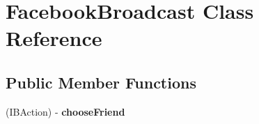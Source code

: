 \hypertarget{interface_facebook_broadcast}{
\section{\-Facebook\-Broadcast \-Class \-Reference}
\label{interface_facebook_broadcast}
}
\subsection*{\-Public \-Member \-Functions}
\begin{DoxyCompactItemize}
\item 
\hypertarget{interface_facebook_broadcast_a8b2eca96e619683969b7187f52d2225a}{
(\-I\-B\-Action) -\/ {\bfseries choose\-Friend}}
\label{interface_facebook_broadcast_a8b2eca96e619683969b7187f52d2225a}

\end{DoxyCompactItemize}
